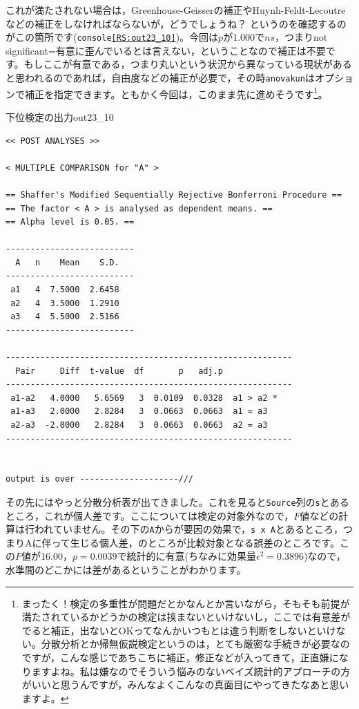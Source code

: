 \documentclass{ltjsarticle}
\begin{document}
これが満たされない場合は，Greenhouse-Geisserの補正やHuynh-Feldt-Lecoutreなどの補正をしなければならないが，どうでしょうね？ というのを確認するのがこの箇所です(\texttt{console\ref{RS:out23_10}})。今回は$p$が1.000で$ns$，つまりnot significant=有意に歪んでいるとは言えない，ということなので補正は不要です。もしここが有意である，つまり丸いという状況から異なっている現状があると思われるのであれば，自由度などの補正が必要で，その時\texttt{anovakun}はオプションで補正を指定できます。ともかく今回は，このまま先に進めそうです\footnote{まったく！検定の多重性が問題だとかなんとか言いながら，そもそも前提が満たされているかどうかの検定は挟まないといけないし，ここでは有意差がでると補正，出ないとOKってなんかいつもとは違う判断をしないといけない。分散分析とか帰無仮説検定というのは，とても厳密な手続きが必要なのですが，こんな感じであちこちに補正，修正などが入ってきて，正直嫌になりますよね。私は嫌なのでそういう悩みのないベイズ統計的アプローチの方がいいと思うんですが，みんなよくこんなの真面目にやってきたなあと思いますよ。}。
\begin{Rscreen}{下位検定の出力}{out23_10}

    \begin{verbatim}
<< POST ANALYSES >>

< MULTIPLE COMPARISON for "A" >

== Shaffer's Modified Sequentially Rejective Bonferroni Procedure ==
== The factor < A > is analysed as dependent means. == 
== Alpha level is 0.05. == 
 
--------------------------
  A   n    Mean    S.D. 
--------------------------
 a1   4  7.5000  2.6458 
 a2   4  3.5000  1.2910 
 a3   4  5.5000  2.5166 
--------------------------

----------------------------------------------------------
  Pair     Diff  t-value  df       p   adj.p            
----------------------------------------------------------
 a1-a2   4.0000   5.6569   3  0.0109  0.0328  a1 > a2 * 
 a1-a3   2.0000   2.8284   3  0.0663  0.0663  a1 = a3   
 a2-a3  -2.0000   2.8284   3  0.0663  0.0663  a2 = a3   
----------------------------------------------------------


output is over --------------------///

\end{verbatim}
\end{Rscreen}
その先にはやっと分散分析表が出てきました。これを見ると\texttt{Source}列の\texttt{s}とあるところ，これが個人差です。ここについては検定の対象外なので，$F$値などの計算は行われていません。その下の\texttt{A}からが要因の効果で，\texttt{s x A}とあるところ，つまりAに伴って生じる個人差，のところが比較対象となる誤差のところです。この$F$値が16.00，$p=0.0039$で統計的に有意(ちなみに効果量$\epsilon^2=0.3896$)なので，水準間のどこかには差があるということがわかります。
\end{document}
